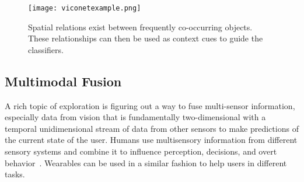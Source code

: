 \begin{figure}[!htb]
\centering
\texttt{[image: viconetexample.png]}
\caption{Spatial relations exist between frequently co-occurring objects. These relationships can then be used as context cues to guide the classifiers.}
\label{fig:viconet}
\end{figure} 

\subsection{Multimodal Fusion}
A rich topic of exploration is figuring out a way to fuse multi-sensor information, especially data from vision that is fundamentally two-dimensional with a temporal 
unidimensional stream of data from other sensors to make predictions of the current state of the user. 
Humans use multisensory information from different sensory systems and combine it to influence 
perception, decisions, and overt behavior~\cite{stein2009neural}. Wearables can be used in a similar fashion to help users in different tasks. 
